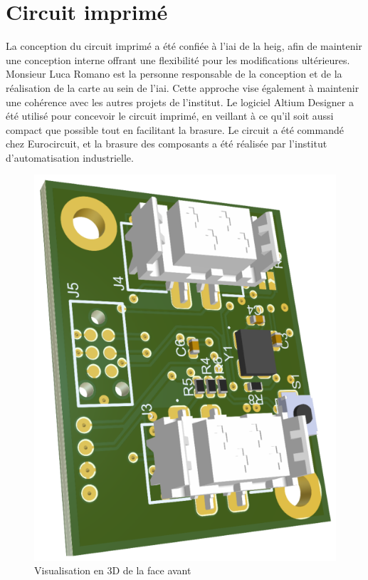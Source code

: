 \section{Circuit imprimé}

La conception du circuit imprimé a été confiée à l'\gls{iai} de la \gls{heig}, afin de maintenir une conception interne offrant une flexibilité pour les modifications ultérieures.
Monsieur Luca Romano est la personne responsable de la conception et de la réalisation de la carte au sein de l'\gls{iai}. Cette approche vise également à maintenir une cohérence avec les autres projets de l'institut.
Le logiciel Altium Designer a été utilisé pour concevoir le circuit imprimé, en veillant à ce qu'il soit aussi compact que possible tout en facilitant la brasure.
Le circuit a été commandé chez Eurocircuit, et la brasure des composants a été réalisée par l'institut d'automatisation industrielle.

\begin{figure}[H]
    \centering
    \includegraphics[scale=0.25]{./assets/figures/pcb_recto.png}
    \caption{Visualisation en 3D de la face avant}
\end{figure}

